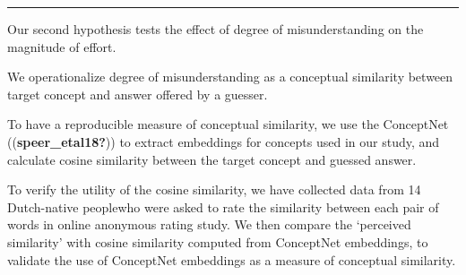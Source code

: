 \documentclass[
  letterpaper,
  DIV=11,
  numbers=noendperiod]{scrreprt}
\begin{document}
\begin{center}\rule{0.5\linewidth}{0.5pt}\end{center}

Our second hypothesis tests the effect of degree of misunderstanding on
the magnitude of effort.

We operationalize degree of misunderstanding as a conceptual similarity
between target concept and answer offered by a guesser.

To have a reproducible measure of conceptual similarity, we use the
ConceptNet ((\textbf{speer\_etal18?})) to extract embeddings for
concepts used in our study, and calculate cosine similarity between the
target concept and guessed answer.

To verify the utility of the cosine similarity, we have collected data
from 14 Dutch-native peoplewho were asked to rate the similarity between
each pair of words in online anonymous rating study. We then compare the
`perceived similarity' with cosine similarity computed from ConceptNet
embeddings, to validate the use of ConceptNet embeddings as a measure of
conceptual similarity.
\end{document}
